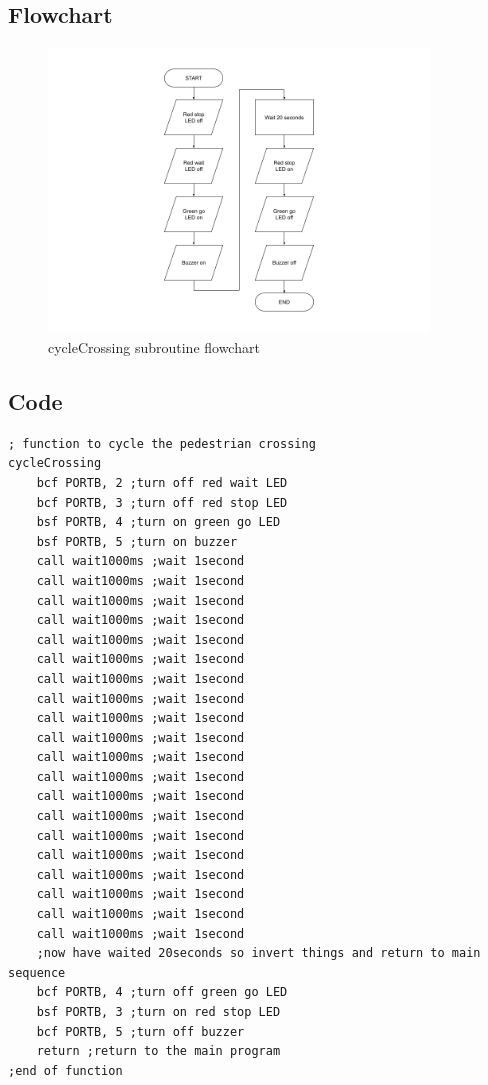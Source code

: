 \subsection*{Flowchart}
\begin{figure}[H]
    \centering
    \includegraphics[width=0.9\textwidth]{images/flowchart-pedCrossingCycle.png}
    \caption{cycleCrossing subroutine flowchart}
    \label{fig:flowchart-cyclePedCrossing}
\end{figure}
\subsection*{Code}
\begin{lstlisting}[language={[x86masm]Assembler}, style=assembly, caption=cycleCrossing subroutine]
; function to cycle the pedestrian crossing
cycleCrossing
	bcf PORTB, 2 ;turn off red wait LED
	bcf PORTB, 3 ;turn off red stop LED
	bsf PORTB, 4 ;turn on green go LED
	bsf PORTB, 5 ;turn on buzzer
	call wait1000ms ;wait 1second
	call wait1000ms ;wait 1second
	call wait1000ms ;wait 1second
	call wait1000ms ;wait 1second
	call wait1000ms ;wait 1second
	call wait1000ms ;wait 1second
	call wait1000ms ;wait 1second
	call wait1000ms ;wait 1second
	call wait1000ms ;wait 1second
	call wait1000ms ;wait 1second
	call wait1000ms ;wait 1second
	call wait1000ms ;wait 1second
	call wait1000ms ;wait 1second
	call wait1000ms ;wait 1second
	call wait1000ms ;wait 1second
	call wait1000ms ;wait 1second
	call wait1000ms ;wait 1second
	call wait1000ms ;wait 1second
	call wait1000ms ;wait 1second
	call wait1000ms ;wait 1second
	;now have waited 20seconds so invert things and return to main sequence
	bcf PORTB, 4 ;turn off green go LED
	bsf PORTB, 3 ;turn on red stop LED
	bcf PORTB, 5 ;turn off buzzer
	return ;return to the main program
;end of function
\end{lstlisting}

